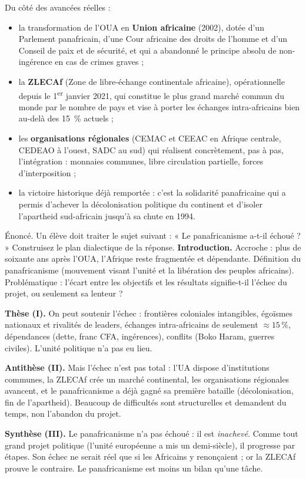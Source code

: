 \documentclass[11pt]{article}
\newcommand{\cle}[1]{{\popxbold\color{popdark}#1}}
\begin{document}
Du côté des \cle{avancées réelles} :
\begin{itemize}
\item la transformation de l'OUA en \textbf{Union africaine} (2002), dotée d'un Parlement panafricain, d'une Cour africaine des droits de l'homme et d'un Conseil de paix et de sécurité, et qui a abandonné le principe absolu de non-ingérence en cas de crimes graves ;
\item la \textbf{ZLECAf} (Zone de libre-échange continentale africaine), opérationnelle depuis le 1\textsuperscript{er} janvier 2021, qui constitue le plus grand marché commun du monde par le nombre de pays et vise à porter les échanges intra-africains bien au-delà des \num{15}~\% actuels ;
\item les \textbf{organisations régionales} (CEMAC et CEEAC en Afrique centrale, CEDEAO à l'ouest, SADC au sud) qui réalisent concrètement, pas à pas, l'intégration : monnaies communes, libre circulation partielle, forces d'interposition ;
\item la victoire historique déjà remportée : c'est la solidarité panafricaine qui a permis d'achever la décolonisation politique du continent et d'isoler l'apartheid sud-africain jusqu'à sa chute en 1994.
\end{itemize}

\begin{exoresolu}
Énoncé. Un élève doit traiter le sujet suivant : « Le panafricanisme a-t-il échoué ? » Construisez le plan dialectique de la réponse.
\tcblower
\textbf{Introduction.} Accroche : plus de soixante ans après l'OUA, l'Afrique reste fragmentée et dépendante. Définition du panafricanisme (mouvement visant l'unité et la libération des peuples africains). Problématique : l'écart entre les objectifs et les résultats signifie-t-il l'échec du projet, ou seulement sa lenteur ?
\par\textbf{Thèse (I).} On peut soutenir l'échec : frontières coloniales intangibles, égoïsmes nationaux et rivalités de leaders, échanges intra-africains de seulement \(\approx 15\,\%\), dépendances (dette, franc CFA, ingérences), conflits (Boko Haram, guerres civiles). L'unité politique n'a pas eu lieu.
\par\textbf{Antithèse (II).} Mais l'échec n'est pas total : l'UA dispose d'institutions communes, la ZLECAf crée un marché continental, les organisations régionales avancent, et le panafricanisme a déjà gagné sa première bataille (décolonisation, fin de l'apartheid). Beaucoup de difficultés sont structurelles et demandent du temps, non l'abandon du projet.
\par\textbf{Synthèse (III).} Le panafricanisme n'a pas échoué : il est \emph{inachevé}. Comme tout grand projet politique (l'unité européenne a mis un demi-siècle), il progresse par étapes. Son échec ne serait réel que si les Africains y renonçaient ; or la ZLECAf prouve le contraire. Le panafricanisme est moins un bilan qu'une tâche.
\end{exoresolu}
\end{document}

